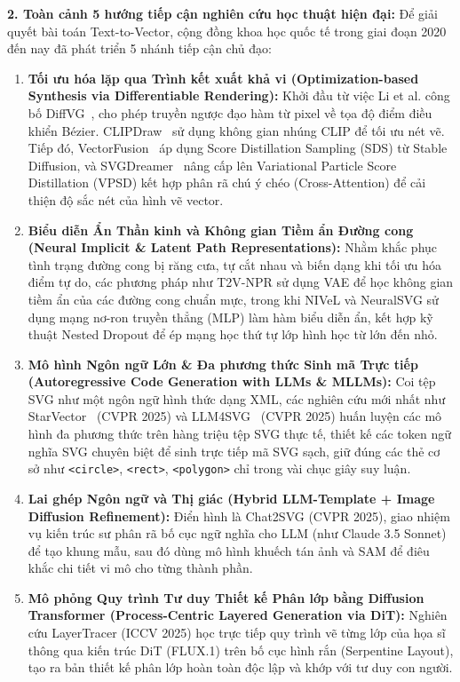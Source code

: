 \textbf{2. Toàn cảnh 5 hướng tiếp cận nghiên cứu học thuật hiện đại:}
Để giải quyết bài toán Text-to-Vector, cộng đồng khoa học quốc tế trong giai đoạn 2020 đến nay đã phát triển 5 nhánh tiếp cận chủ đạo:
\begin{enumerate}
    \item \textbf{Tối ưu hóa lặp qua Trình kết xuất khả vi (Optimization-based Synthesis via Differentiable Rendering):} Khởi đầu từ việc Li et al. công bố DiffVG~\citep{li2020diffvg}, cho phép truyền ngược đạo hàm từ pixel về tọa độ điểm điều khiển Bézier. CLIPDraw~\citep{frans2022clipdraw} sử dụng không gian nhúng CLIP để tối ưu nét vẽ. Tiếp đó, VectorFusion~\citep{jain2023vectorfusion} áp dụng Score Distillation Sampling (SDS) từ Stable Diffusion, và SVGDreamer~\citep{xing2024svgdreamer} nâng cấp lên Variational Particle Score Distillation (VPSD) kết hợp phân rã chú ý chéo (Cross-Attention) để cải thiện độ sắc nét của hình vẽ vector.
    \item \textbf{Biểu diễn Ẩn Thần kinh và Không gian Tiềm ẩn Đường cong (Neural Implicit \& Latent Path Representations):} Nhằm khắc phục tình trạng đường cong bị răng cưa, tự cắt nhau và biến dạng khi tối ưu hóa điểm tự do, các phương pháp như T2V-NPR sử dụng VAE để học không gian tiềm ẩn của các đường cong chuẩn mực, trong khi NIVeL và NeuralSVG sử dụng mạng nơ-ron truyền thẳng (MLP) làm hàm biểu diễn ẩn, kết hợp kỹ thuật Nested Dropout để ép mạng học thứ tự lớp hình học từ lớn đến nhỏ.
    \item \textbf{Mô hình Ngôn ngữ Lớn \& Đa phương thức Sinh mã Trực tiếp (Autoregressive Code Generation with LLMs \& MLLMs):} Coi tệp SVG như một ngôn ngữ hình thức dạng XML, các nghiên cứu mới nhất như StarVector~\citep{rodriguez2025starvector} (CVPR 2025) và LLM4SVG~\citep{xing2025llm4svg} (CVPR 2025) huấn luyện các mô hình đa phương thức trên hàng triệu tệp SVG thực tế, thiết kế các token ngữ nghĩa SVG chuyên biệt để sinh trực tiếp mã SVG sạch, giữ đúng các thẻ cơ sở như \texttt{<circle>}, \texttt{<rect>}, \texttt{<polygon>} chỉ trong vài chục giây suy luận.
    \item \textbf{Lai ghép Ngôn ngữ và Thị giác (Hybrid LLM-Template + Image Diffusion Refinement):} Điển hình là Chat2SVG (CVPR 2025), giao nhiệm vụ kiến trúc sư phân rã bố cục ngữ nghĩa cho LLM (như Claude 3.5 Sonnet) để tạo khung mẫu, sau đó dùng mô hình khuếch tán ảnh và SAM để điêu khắc chi tiết vi mô cho từng thành phần.
    \item \textbf{Mô phỏng Quy trình Tư duy Thiết kế Phân lớp bằng Diffusion Transformer (Process-Centric Layered Generation via DiT):} Nghiên cứu LayerTracer (ICCV 2025) học trực tiếp quy trình vẽ từng lớp của họa sĩ thông qua kiến trúc DiT (FLUX.1) trên bố cục hình rắn (Serpentine Layout), tạo ra bản thiết kế phân lớp hoàn toàn độc lập và khớp với tư duy con người.
\end{enumerate}

